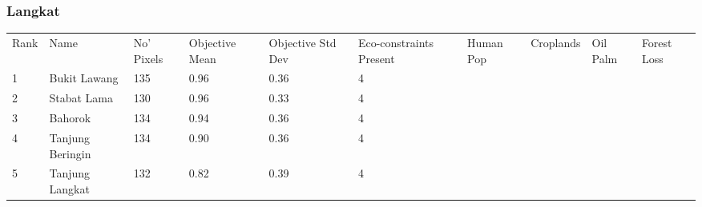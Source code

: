 \subsubsection{Langkat}
\begin{table}[ht]
\centering
\begingroup\fontsize{9pt}{10pt}\selectfont
\begin{tabular}{C{0.05\textwidth}C{0.15\textwidth}C{0.08\textwidth}C{0.08\textwidth}C{0.08\textwidth}C{0.08\textwidth}C{0.08\textwidth}C{0.08\textwidth}C{0.08\textwidth}C{0.08\textwidth}}
 Rank & Name & No' Pixels & Objective Mean & Objective Std Dev & Eco-constraints  Present & Human Pop & Croplands & Oil Palm & Forest Loss \\ 
 {1} & Bukit Lawang & 135 & \textcolor[HTML]{FFFFFF}{0.96} & \textcolor[HTML]{000000}{0.36} & \textcolor[HTML]{000000}{4} &  &  &  &  \\ 
  {2} & Stabat Lama & 130 & \textcolor[HTML]{FFFFFF}{0.96} & \textcolor[HTML]{000000}{0.33} & \textcolor[HTML]{000000}{4} &  &  &  &  \\ 
  {3} & Bahorok & 134 & \textcolor[HTML]{FFFFFF}{0.94} & \textcolor[HTML]{000000}{0.36} & \textcolor[HTML]{000000}{4} &  &  &  &  \\ 
  {4} & Tanjung Beringin & 134 & \textcolor[HTML]{FFFFFF}{0.90} & \textcolor[HTML]{000000}{0.36} & \textcolor[HTML]{000000}{4} &  &  &  &  \\ 
  {5} & Tanjung Langkat & 132 & \textcolor[HTML]{FFFFFF}{0.82} & \textcolor[HTML]{000000}{0.39} & \textcolor[HTML]{000000}{4} &  &  &  &  \\ 

\end{tabular}
\end{table}
